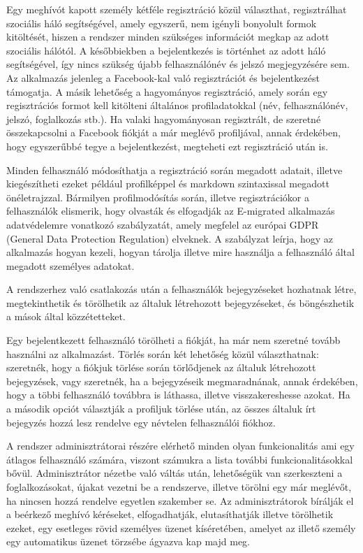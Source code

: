 Egy meghívót kapott személy kétféle regisztráció közül választhat, regisztrálhat szociális háló segítségével, amely egyszerű, nem igényli bonyolult formok kitöltését, hiszen a rendszer minden szükséges információt megkap az adott szociális hálótól. A későbbiekben a bejelentkezés is történhet az adott háló segítségével, így nincs szükség újabb felhasználónév és jelszó megjegyzésére sem. Az alkalmazás jelenleg a Facebook-kal való regisztrációt és bejelentkezést támogatja. A másik lehetőség a hagyományos regisztráció, amely során egy regisztrációs formot kell kitölteni általános profiladatokkal (név, felhasználónév, jelszó, foglalkozás stb.). Ha valaki hagyományosan regisztrált, de szeretné összekapcsolni a Facebook fiókját a már meglévő profiljával, annak érdekében, hogy egyszerűbbé tegye a bejelentkezést, megteheti ezt regisztráció után is. 

Minden felhasználó módosíthatja a regisztráció során megadott adatait, illetve kiegészítheti ezeket például profilképpel és markdown szintaxissal megadott önéletrajzzal. Bármilyen profilmodósítás során, illetve regisztrációkor a felhasználók elismerik, hogy olvasták és elfogadják az E-migrated alkalmazás adatvédelemre vonatkozó szabályzatát, amely megfelel az európai GDPR (General Data Protection Regulation) elveknek. A szabályzat leírja, hogy az alkalmazás hogyan kezeli, hogyan tárolja illetve mire használja a felhasználó által megadott személyes adatokat.

A rendszerhez való csatlakozás után a felhasználók bejegyzéseket hozhatnak létre, megtekinthetik és törölhetik az általuk létrehozott bejegyzéseket, és böngészhetik a mások által közzétetteket. 

Egy bejelentkezett felhasználó törölheti a fiókját, ha már nem szeretné tovább használni az alkalmazást. Törlés során két lehetőség közül választhatnak: szeretnék, hogy a fiókjuk törlése során törlődjenek az általuk létrehozott bejegyzések, vagy szeretnék, ha a bejegyzéseik megmaradnának, annak érdekében, hogy a többi felhasználó továbbra is láthassa, illetve visszakereshesse azokat. Ha a második opciót választják a profiljuk törlése után, az összes általuk írt bejegyzés hozzá lesz rendelve egy névtelen felhasználói fiókhoz.

A rendszer adminisztrátorai részére elérhető minden olyan funkcionalitás ami egy átlagos felhasználó számára, viszont számukra a lista további funkcionalitásokkal bővül. Adminisztrátor nézetbe való váltás után, lehetőségük van szerkeszteni a foglalkozásokat, újakat vezetni be a rendszerve, illetve törölni egy már meglévőt, ha nincsen hozzá rendelve egyetlen szakember se. Az adminisztrátorok bírálják el a beérkező meghívó kéréseket, elfogadhatják, elutasíthatják illetve törölhetik ezeket, egy esetleges rövid személyes üzenet kíséretében, amelyet az illető személy egy automatikus üzenet törzsébe ágyazva kap majd meg. 

